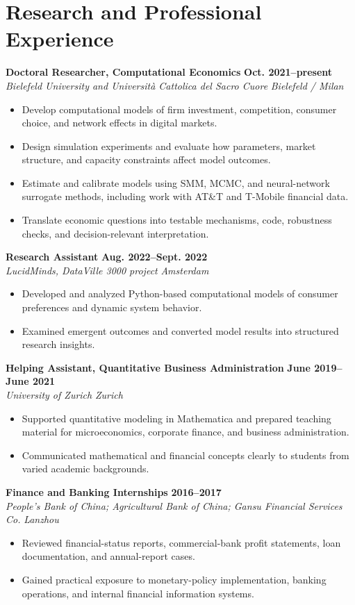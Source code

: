 \documentclass[a4paper,11pt]{article}
\newcommand{\role}[4]{%
  \textbf{#1} \hfill \textbf{#2}\\
  \textit{#3} \hfill \textit{#4}\par
}
\begin{document}
\section{Research and Professional Experience}
\role{Doctoral Researcher, Computational Economics}{Oct. 2021--present}{Bielefeld University and Universit\`a Cattolica del Sacro Cuore}{Bielefeld / Milan}
\begin{itemize}
  \item Develop computational models of firm investment, competition, consumer choice, and network effects in digital markets.
  \item Design simulation experiments and evaluate how parameters, market structure, and capacity constraints affect model outcomes.
  \item Estimate and calibrate models using SMM, MCMC, and neural-network surrogate methods, including work with AT\&T and T-Mobile financial data.
  \item Translate economic questions into testable mechanisms, code, robustness checks, and decision-relevant interpretation.
\end{itemize}

\role{Research Assistant}{Aug. 2022--Sept. 2022}{LucidMinds, DataVille 3000 project}{Amsterdam}
\begin{itemize}
  \item Developed and analyzed Python-based computational models of consumer preferences and dynamic system behavior.
  \item Examined emergent outcomes and converted model results into structured research insights.
\end{itemize}

\role{Helping Assistant, Quantitative Business Administration}{June 2019--June 2021}{University of Zurich}{Zurich}
\begin{itemize}
  \item Supported quantitative modeling in Mathematica and prepared teaching material for microeconomics, corporate finance, and business administration.
  \item Communicated mathematical and financial concepts clearly to students from varied academic backgrounds.
\end{itemize}

\role{Finance and Banking Internships}{2016--2017}{People's Bank of China; Agricultural Bank of China; Gansu Financial Services Co.}{Lanzhou}
\begin{itemize}
  \item Reviewed financial-status reports, commercial-bank profit statements, loan documentation, and annual-report cases.
  \item Gained practical exposure to monetary-policy implementation, banking operations, and internal financial information systems.
\end{itemize}
\end{document}
